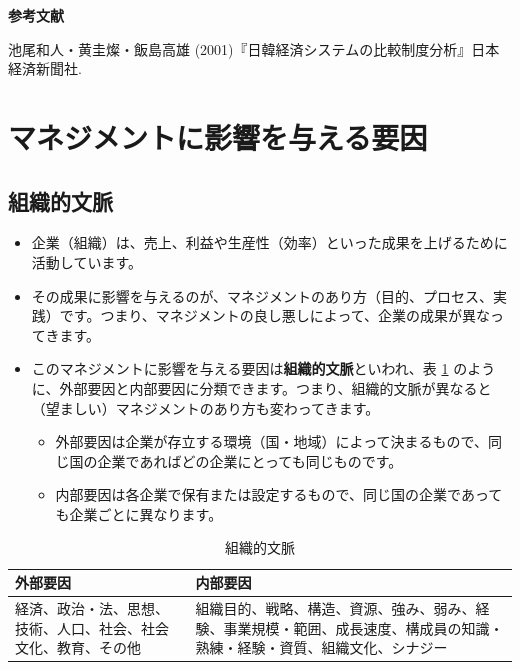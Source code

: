 \documentclass[
]{book}
\begin{document}
{\textbf{参考文献}}

池尾和人・黄圭燦・飯島高雄 (2001)『日韓経済システムの比較制度分析』日本経済新聞社.

\hypertarget{factor}{%
\section{マネジメントに影響を与える要因}\label{factor}}

\hypertarget{organizational-context}{%
\subsection{組織的文脈}\label{organizational-context}}

\begin{itemize}
\item
  企業（組織）は、売上、利益や生産性（効率）といった成果を上げるために活動しています。
\item
  その成果に影響を与えるのが、マネジメントのあり方（目的、プロセス、実践）です。つまり、マネジメントの良し悪しによって、企業の成果が異なってきます。
\item
  このマネジメントに影響を与える要因は\textbf{組織的文脈}といわれ、表 \ref{tab:factor} のように、外部要因と内部要因に分類できます。つまり、組織的文脈が異なると（望ましい）マネジメントのあり方も変わってきます。

  \begin{itemize}
  \item
    外部要因は企業が存立する環境（国・地域）によって決まるもので、同じ国の企業であればどの企業にとっても同じものです。
  \item
    内部要因は各企業で保有または設定するもので、同じ国の企業であっても企業ごとに異なります。
  \end{itemize}
\end{itemize}

\begin{table}

\caption{\label{tab:factor}組織的文脈}
\centering
\begin{tabular}[t]{l|l}
\hline
外部要因 & 内部要因\\
\hline
経済、政治・法、思想、技術、人口、社会、社会文化、教育、その他 & 組織目的、戦略、構造、資源、強み、弱み、経験、事業規模・範囲、成長速度、構成員の知識・熟練・経験・資質、組織文化、シナジー\\
\hline
\end{tabular}
\end{table}
\end{document}
